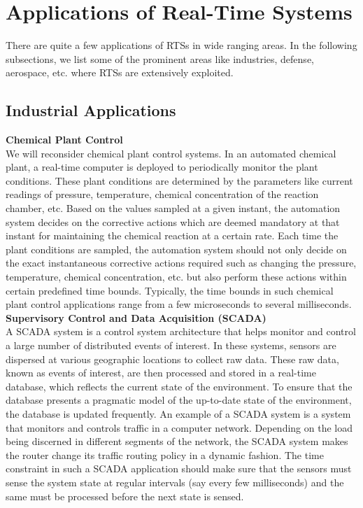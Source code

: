 \documentclass[12pt]{report}
\begin{document}
\section{Applications of Real-Time Systems}
There are quite a few applications of RTSs in wide ranging areas. In the following subsections, we list some of the prominent areas like industries, defense, aerospace, etc. where RTSs are extensively exploited. 

\subsection{Industrial Applications}
\noindent \textbf{Chemical Plant Control}\\
We will reconsider chemical plant control systems. In an automated chemical plant, a real-time computer is deployed to periodically monitor the plant conditions. These plant conditions are determined by the parameters like current readings of pressure, temperature, chemical concentration of the reaction chamber, etc. Based on the values sampled at a given instant, the automation system decides on the corrective actions which are deemed mandatory at that instant for maintaining the chemical reaction at a certain rate. Each time the plant conditions are sampled, the automation system should not only decide on the exact instantaneous corrective actions required such as changing the pressure, temperature, chemical concentration, etc. but also perform these actions within certain predefined time bounds. Typically, the time bounds in such chemical plant control applications range from a few microseconds to several milliseconds.\\

\noindent\textbf{Supervisory Control and Data Acquisition (SCADA)}\\
A SCADA system is a control system architecture that helps monitor and control a large number of distributed events of interest. In these systems, sensors are dispersed at various geographic locations to collect raw data. These raw data, known as events of interest, are then processed and stored in a real-time database, which reflects the current state of the environment. To ensure that the database presents a pragmatic model of the up-to-date state of the environment, the database is updated frequently. An example of a SCADA system is a system that monitors and controls traffic in a computer network. Depending on the load being discerned in different segments of the network, the SCADA system makes the router change its traffic routing policy in a dynamic fashion. The time constraint in such a SCADA application should make sure that the sensors must sense the system state at regular intervals (say every few milliseconds) and the same must be processed before the next state is sensed.\\
\end{document}
